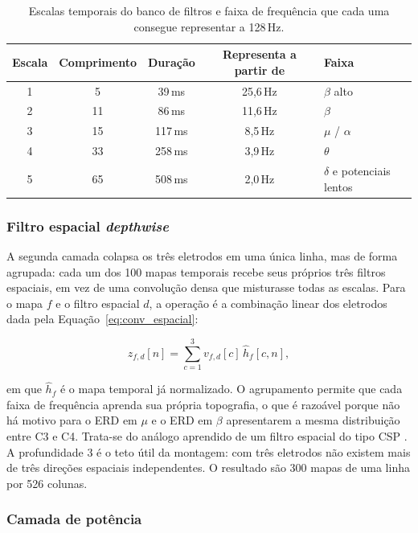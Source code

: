 \documentclass[12pt,a4paper]{article}
\newcommand{\fonte}[1]{\par\vspace{2pt}{\footnotesize Fonte: #1}}
\newenvironment{quadro}[1][htbp]{\begin{table}[#1]}{\end{table}}
\begin{document}
\begin{quadro}[htbp]
\centering
\caption{Escalas temporais do banco de filtros e faixa de frequência que cada uma consegue
representar a 128\,Hz.}
\label{qua:escalas}
\footnotesize
\begin{tabular}{|c|c|c|c|l|}
\hline
\rowcolor[HTML]{EFEFEF}
\textbf{Escala} & \textbf{Comprimento} & \textbf{Duração} & \textbf{Representa a partir de} & \textbf{Faixa} \\ \hline
1 & 5  & 39\,ms  & 25,6\,Hz & $\beta$ alto \\ \hline
2 & 11 & 86\,ms  & 11,6\,Hz & $\beta$ \\ \hline
3 & 15 & 117\,ms & 8,5\,Hz  & $\mu$ / $\alpha$ \\ \hline
4 & 33 & 258\,ms & 3,9\,Hz  & $\theta$ \\ \hline
5 & 65 & 508\,ms & 2,0\,Hz  & $\delta$ e potenciais lentos \\ \hline
\end{tabular}
\fonte{o autor (2026).}
\end{quadro}

\subsubsection{Filtro espacial \textit{depthwise}}

A segunda camada colapsa os três eletrodos em uma única linha, mas de forma agrupada: cada um
dos 100 mapas temporais recebe seus próprios três filtros espaciais, em vez de uma convolução
densa que misturasse todas as escalas. Para o mapa $f$ e o filtro espacial $d$, a operação é a
combinação linear dos eletrodos dada pela Equação~\ref{eq:conv_espacial}:

\begin{equation}\label{eq:conv_espacial}
z_{f,d}[n] = \sum_{c=1}^{3} v_{f,d}[c]\, \hat{h}_{f}[c, n],
\end{equation}

\noindent em que $\hat{h}_f$ é o mapa temporal já normalizado. O agrupamento permite que cada
faixa de frequência aprenda sua própria topografia, o que é razoável porque não há motivo
para o ERD em $\mu$ e o ERD em $\beta$ apresentarem a mesma distribuição entre C3 e C4.
Trata-se do análogo aprendido de um filtro espacial do tipo CSP \cite{ramoser2000,ang2008}. A
profundidade 3 é o teto útil da montagem: com três eletrodos não existem mais de três
direções espaciais independentes. O resultado são 300 mapas de uma linha por 526 colunas.

\subsubsection{Camada de potência}
\end{document}
